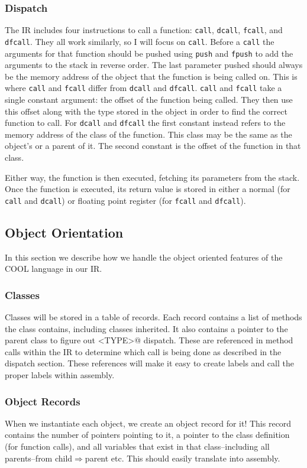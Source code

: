 \documentclass[10pt, onecolumn]{extarticle}
\begin{document}
\subsubsection{Dispatch}
The IR includes four instructions to call a function: \texttt{call}, \texttt{dcall}, \texttt{fcall}, and \texttt{dfcall}.
They all work similarly, so I will focus on \texttt{call}. Before a \texttt{call} the arguments for that function should
be pushed using \texttt{push} and \texttt{fpush} to add the arguments to the stack in reverse order. The last parameter
pushed should always be the memory address of the object that the function is being called on. This is where \texttt{call}
and \texttt{fcall} differ from \texttt{dcall} and \texttt{dfcall}. \texttt{call} and \texttt{fcall} take a single constant argument: the
offset of the function being called. They then use this offset along with the type stored in the object in order to find
the correct function to call. For \texttt{dcall} and \texttt{dfcall} the first constant instead refers to the memory address
of the class of the function. This class may be the same as the object's or a parent of it. The second constant is the offset
of the function in that class.

Either way, the function is then executed, fetching its parameters from the stack. Once the function is executed, its return
value is stored in either a normal (for \texttt{call} and \texttt{dcall}) or floating point register (for \texttt{fcall}
and \texttt{dfcall}).

\subsection{Object Orientation}
In this section we describe how we handle the object oriented features of the COOL language in our IR.

\subsubsection{Classes}
Classes will be stored in a table of records. Each record contains a list of methods the class contains, including classes inherited. It also contains a pointer to the parent class to figure out \textless{}TYPE\textgreater{}@ dispatch. These are referenced in method calls within the IR to determine which call is being done as described in the dispatch section. These references will make it easy to create labels and call the proper labels within assembly.

\subsubsection{Object Records}
When we instantiate each object, we create an object record for it! This record contains the number of pointers pointing to it, a pointer to the class definition (for function calls), and all variables that exist in that class--including all parents--from child$\Rightarrow$parent etc. This should easily translate into assembly.
\end{document}
